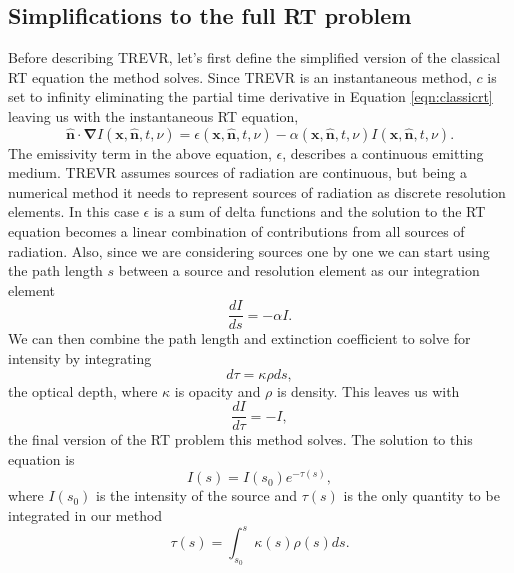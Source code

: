 \documentclass[fleq,usenatbib]{mnras}
\newcommand{\acro}{TREVR}
\begin{document}
\subsection{Simplifications to the full RT problem}\label{sec:rteq}
Before describing \acro{}, let's first define the 
simplified version of the classical RT equation the method solves. Since 
\acro{} is an instantaneous method, $c$ is set to infinity eliminating the 
partial time derivative in Equation \ref{eqn:classicrt} leaving us with the 
instantaneous RT equation,
\begin{equation} \label{infcrt}
\mathbf{\hat{n} \cdot \nabla} I\left(\mathbf{x}, \mathbf{\hat{n}}, t, 
\nu\right) = \epsilon\left(\mathbf{x}, \mathbf{\hat{n}}, t, \nu\right) - 
\alpha\left(\mathbf{x}, \mathbf{\hat{n}}, t, \nu\right) 
I\left(\mathbf{x}, \mathbf{\hat{n}}, t, \nu\right).
\end{equation}
The emissivity term in the above equation, $\epsilon$, describes a continuous 
emitting medium. \acro{} assumes sources of radiation are continuous, but 
being a numerical method it needs to represent sources of radiation as 
discrete resolution elements. In this case $\epsilon$ is a sum of delta 
functions and the solution to the RT equation becomes a linear combination of 
contributions from all sources of radiation. Also, since we are considering 
sources one by one we can start using the path length $s$ between a source and 
resolution element as our integration element
\begin{equation}
\label{eqn:combtransfer}
\frac{dI}{ds} = -\alpha I.
\end{equation}
We can then combine the path length and extinction coefficient to solve for 
intensity by integrating 
\begin{equation}
\label{eqn:dtau}
d\tau = \kappa \rho ds, 
\end{equation}
the optical depth, where $\kappa$ is opacity and $\rho$ is density. This 
leaves us with
\begin{equation}
\label{eqn:absorbtransfer}
\frac{dI}{d\tau} = -I,
\end{equation}
the final version of the RT problem this method solves. The solution to this 
equation is 
\begin{equation}
\label{eqn:ient}
I(s) = I(s_0)e^{-\tau(s)},
\end{equation}
where $I(s_0)$ is the intensity of the source and $\tau(s)$ is the only 
quantity to be integrated in our method
\begin{equation}
\label{eqn:tauint}
\tau(s) = \int_{s_0}^s \kappa(s) \rho(s) ds.
\end{equation}
\end{document}
